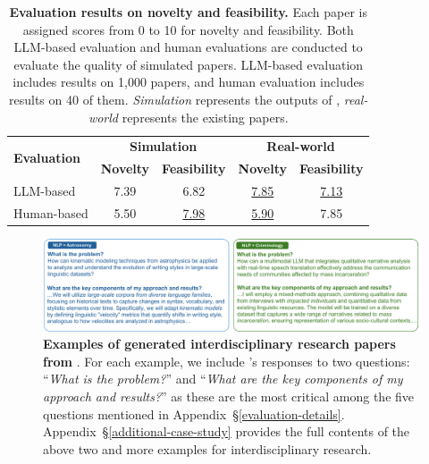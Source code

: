 \begin{table}[t]
\setlength\tabcolsep{4pt}
\centering
\small
\caption{\textbf{Evaluation results on novelty and feasibility.} Each paper is assigned scores from 0 to 10 for novelty and feasibility. Both LLM-based evaluation and human evaluations are conducted to evaluate the quality of simulated papers. LLM-based evaluation includes results on 1,000 papers, and human evaluation includes results on 40 of them. \textit{Simulation} represents the outputs of \envname, \textit{real-world} represents the existing papers.}
\begin{tabular}{lcccc}
\toprule
\multirow{2}{*}{\textbf{Evaluation}} & \multicolumn{2}{c}{\textbf{Simulation}} & \multicolumn{2}{c}{\textbf{Real-world}} \\
\cmidrule(lr){2-3} \cmidrule(lr){4-5}
 & \textbf{Novelty} & \textbf{Feasibility} & \textbf{Novelty} & \textbf{Feasibility} \\
\midrule
LLM-based & 7.39 & 6.82 & \underline{7.85} & \underline{7.13} \\
Human-based &  5.50 & \underline{7.98} & \underline{5.90} & 7.85 \\
\bottomrule
\end{tabular}
\vspace{-5mm}
\label{tab:novelty_feasibility}
\end{table}


\begin{figure}[t]
    \centering
    \includegraphics[width=\linewidth]{figs/case_study.pdf}
    \caption{\textbf{Examples of generated interdisciplinary research papers from \envname}. For each example, we include \envname's responses to two questions: ``\textit{What is the problem?}'' and ``\textit{What are the key components of my approach and results?}'' as these are the most critical among the five questions mentioned in Appendix~\S\ref{evaluation-details}. Appendix~\S\ref{additional-case-study} provides the full contents of the above two and more examples for interdisciplinary research.}
    \label{fig:case-study}
    \vspace{-4mm}
\end{figure}



